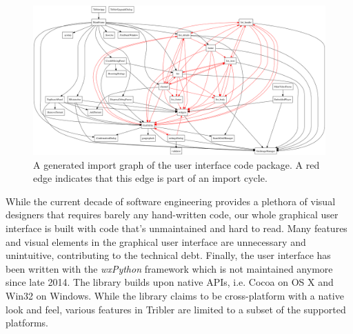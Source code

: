 \begin{figure}[!h]
	\centering
	\includegraphics[width=1.0\columnwidth]{images/problem_description/wx_cycles}
	\caption{A generated import graph of the user interface code package. A red edge indicates that this edge is part of an import cycle.}
	\label{fig:wx-import-graph}
\end{figure}

While the current decade of software engineering provides a plethora of visual designers that requires barely any hand-written code, our whole graphical user interface is built with code that's unmaintained and hard to read. Many features and visual elements in the graphical user interface are unnecessary and unintuitive, contributing to the technical debt. Finally, the user interface has been written with the \emph{wxPython} framework which is not maintained anymore since late 2014. The library builds upon native APIs, i.e. Cocoa on OS X and Win32 on Windows. While the library claims to be cross-platform with a native look and feel, various features in Tribler are limited to a subset of the supported platforms.

